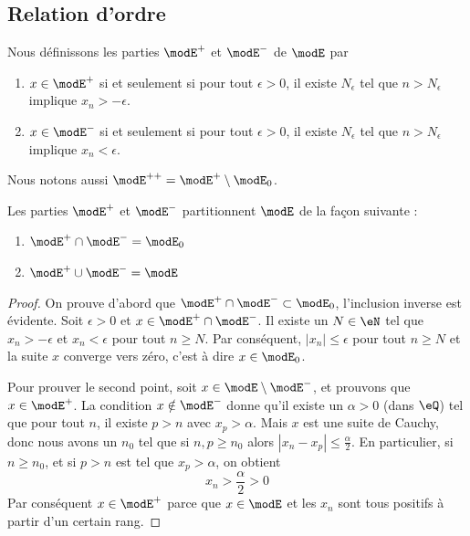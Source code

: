 \subsection{Relation d'ordre}

Nous définissons les parties \( \modE^+\) et \( \modE^-\) de \( \modE\) par
\begin{enumerate}
    \item
        \( x\in  \modE^+\) si et seulement si pour tout \( \epsilon>0\), il existe \( N_{\epsilon}\) tel que \( n>N_{\epsilon}\) implique \( x_n>-\epsilon\).
    \item
        \( x\in  \modE^-\) si et seulement si pour tout \( \epsilon>0\), il existe \( N_{\epsilon}\) tel que \( n>N_{\epsilon}\) implique \( x_n<\epsilon\).
\end{enumerate}
Nous notons aussi \( \modE^{++}=\modE^+\setminus\modE_0\).

\begin{lemma}
    Les parties \( \modE^+\) et \( \modE^-\) partitionnent \( \modE\) de la façon suivante :
    \begin{enumerate}
        \item
            \( \modE^+\cap\modE^-=\modE_0\)
        \item
            \( \modE^+\cup\modE^-=\modE\)
    \end{enumerate}
\end{lemma}

\begin{proof}
    On prouve d'abord que \( \modE^+\cap\modE^-\subset\modE_0\), l'inclusion inverse est évidente. Soit \( \epsilon>0\) et \( x\in \modE^+\cap\modE^-\). Il existe un \( N\in \eN\) tel que \( x_n>-\epsilon\) et \( x_n<\epsilon\) pour tout \( n\geq N\). Par conséquent, \( | x_n |\leq \epsilon\) pour tout \( n\geq N\) et la suite \( x\) converge vers zéro, c'est à dire \( x\in\modE_0\).

    Pour prouver le second point, soit \( x\in \modE\setminus\modE^-\), et prouvons que \( x\in\modE^+\). La condition \( x\notin \modE^-\) donne qu'il existe un \( \alpha>0\) (dans \( \eQ\)) tel que pour tout \( n\), il existe \( p>n\) avec \( x_p>\alpha\). Mais \( x\) est une suite de Cauchy, donc nous avons un \( n_0\) tel que si \( n,p\geq n_0\) alors \( | x_n-x_p |\leq \frac{ \alpha }{2}\). En particulier, si \( n\geq n_0\), et si \( p>n\) est tel que \( x_p>\alpha\), on obtient
    \begin{equation}
        x_n>\frac{ \alpha }{2}>0
    \end{equation}
    Par conséquent \( x\in\modE^+\) parce que \( x\in\modE\) et les \( x_n \) sont tous positifs à partir d'un certain rang.
\end{proof}

